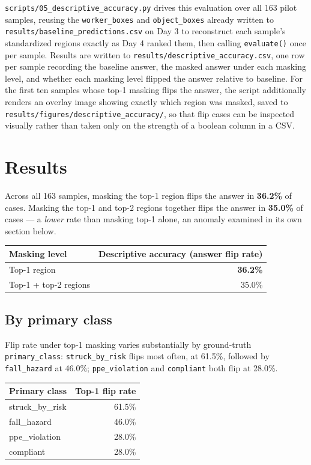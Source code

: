 \texttt{scripts/05\_descriptive\_accuracy.py} drives this evaluation over all 163 pilot samples,
reusing the \texttt{worker\_boxes} and \texttt{object\_boxes} already written to
\texttt{results/baseline\_predictions.csv} on Day 3 to reconstruct each sample's standardized regions
exactly as Day 4 ranked them, then calling \texttt{evaluate()} once per sample. Results are written to
\texttt{results/descriptive\_accuracy.csv}, one row per sample recording the baseline answer, the
masked answer under each masking level, and whether each masking level flipped the answer relative to
baseline. For the first ten samples whose top-1 masking flips the answer, the script additionally
renders an overlay image showing exactly which region was masked, saved to
\texttt{results/figures/descriptive\_accuracy/}, so that flip cases can be inspected visually rather
than taken only on the strength of a boolean column in a CSV.

\section{Results}

Across all 163 samples, masking the top-1 region flips the answer in \textbf{36.2\%} of cases.
Masking the top-1 and top-2 regions together flips the answer in \textbf{35.0\%} of cases --- a
\emph{lower} rate than masking top-1 alone, an anomaly examined in its own section below.

\begin{center}
\begin{tabular}{lr}
\toprule
\textbf{Masking level} & \textbf{Descriptive accuracy (answer flip rate)} \\
\midrule
Top-1 region & \textbf{36.2\%} \\
Top-1 + top-2 regions & 35.0\% \\
\bottomrule
\end{tabular}
\end{center}

\subsection{By primary class}

Flip rate under top-1 masking varies substantially by ground-truth \texttt{primary\_class}:
\texttt{struck\_by\_risk} flips most often, at 61.5\%, followed by \texttt{fall\_hazard} at 46.0\%;
\texttt{ppe\_violation} and \texttt{compliant} both flip at 28.0\%.

\begin{center}
\begin{tabular}{lr}
\toprule
\textbf{Primary class} & \textbf{Top-1 flip rate} \\
\midrule
struck\_by\_risk & 61.5\% \\
fall\_hazard & 46.0\% \\
ppe\_violation & 28.0\% \\
compliant & 28.0\% \\
\bottomrule
\end{tabular}
\end{center}

